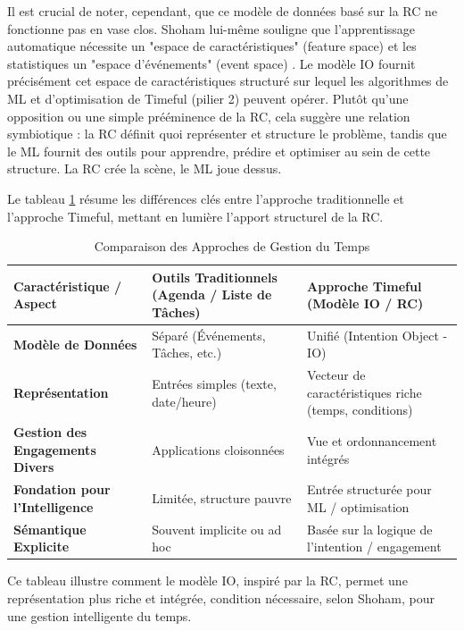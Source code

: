 \documentclass[11pt,a4paper]{article}
\begin{document}
Il est crucial de noter, cependant, que ce modèle de données basé sur la RC ne fonctionne pas en vase clos. Shoham lui-même souligne que l'apprentissage automatique nécessite un "espace de caractéristiques" (feature space) et les statistiques un "espace d'événements" (event space) \citep{Shoham2015Why}. Le modèle IO fournit précisément cet espace de caractéristiques structuré sur lequel les algorithmes de ML et d'optimisation de Timeful (pilier 2) peuvent opérer. Plutôt qu'une opposition ou une simple prééminence de la RC, cela suggère une relation symbiotique : la RC définit quoi représenter et structure le problème, tandis que le ML fournit des outils pour apprendre, prédire et optimiser au sein de cette structure. La RC crée la scène, le ML joue dessus.

Le tableau \ref{tab:time_mgmt_comparison} résume les différences clés entre l'approche traditionnelle et l'approche Timeful, mettant en lumière l'apport structurel de la RC.\\
\begin{table}[htbp] 
\caption{Comparaison des Approches de Gestion du Temps}
\label{tab:time_mgmt_comparison}
\begin{tabular}{>{\RaggedRight}p{} >{\RaggedRight}p{} >{\RaggedRight}p{}}
\toprule
\textbf{Caractéristique / Aspect} & \textbf{Outils Traditionnels (Agenda / Liste de Tâches)} & \textbf{Approche Timeful (Modèle IO / RC)} \\
\midrule
\textbf{Modèle de Données} & Séparé (Événements, Tâches, etc.) & Unifié (Intention Object - IO) \\
\addlinespace
\textbf{Représentation} & Entrées simples (texte, date/heure) & Vecteur de caractéristiques riche (temps, conditions) \\
\addlinespace
\textbf{Gestion des Engagements Divers} & Applications cloisonnées & Vue et ordonnancement intégrés \\
\addlinespace
\textbf{Fondation pour l'Intelligence} & Limitée, structure pauvre & Entrée structurée pour ML / optimisation \\
\addlinespace
\textbf{Sémantique Explicite} & Souvent implicite ou ad hoc & Basée sur la logique de l'intention / engagement \\
\bottomrule
\end{tabular}
\end{table} %


Ce tableau illustre comment le modèle IO, inspiré par la RC, permet une représentation plus riche et intégrée, condition nécessaire, selon Shoham, pour une gestion intelligente du temps.
\end{document}
